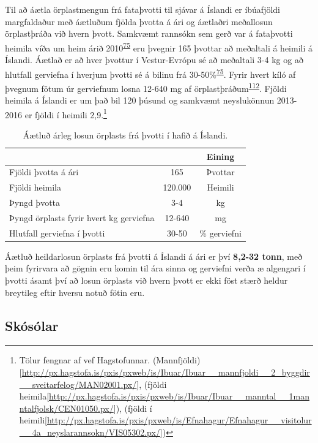 \documentclass[icelandic,]{book}
\let\rmarkdownfootnote\footnote%
\def\footnote{\protect\rmarkdownfootnote}
\begin{document}
Til að áætla örplastmengun frá fataþvotti til sjávar á Íslandi er íbúafjöldi margfaldaður með áætluðum fjölda þvotta á ári og áætlaðri meðallosun örplastþráða við hvern þvott. Samkvæmt rannsókn sem gerð var á fataþvotti heimila víða um heim árið 2010\textsuperscript{\protect\hyperlink{ref-Pakula2010}{75}} eru þvegnir 165 þvottar að meðaltali á heimili á Íslandi. Áætlað er að hver þvottur í Vestur-Evrópu sé að meðaltali 3-4 kg og að hlutfall gerviefna í hverjum þvotti sé á bilinu frá 30-50\%\textsuperscript{\protect\hyperlink{ref-Pakula2010}{75}}. Fyrir hvert kíló af þvegnum fötum úr gerviefnum losna 12-640 mg af örplastþráðum\textsuperscript{\protect\hyperlink{ref-magnusson2016swedish}{112}}. Fjöldi heimila á Íslandi er um það bil 120 þúsund og samkvæmt neyslukönnun 2013-2016 er fjöldi í heimili 2,9.\footnote{Tölur fengnar af vef Hagstofunnar. (Mannfjöldi){[}\url{http://px.hagstofa.is/pxis/pxweb/is/Ibuar/Ibuar__mannfjoldi__2_byggdir__sveitarfelog/MAN02001.px/}{]}, (fjöldi heimila{[}\url{http://px.hagstofa.is/pxis/pxweb/is/Ibuar/Ibuar__manntal__1manntalfjolsk/CEN01050.px/}{]}), (fjöldi í heimili{[}\url{http://px.hagstofa.is/pxis/pxweb/is/Efnahagur/Efnahagur__visitolur__4a_neyslarannsokn/VIS05302.px/}{]})}

\begin{table}[t]

\caption{\label{tab:unnamed-chunk-12}Áætluð árleg losun örplasts frá þvotti í hafið á Íslandi.}
\centering
\begin{tabular}{lcc}
\toprule
  &  & Eining\\
\midrule
Fjöldi þvotta á ári & 165 & Þvottar\\
Fjöldi heimila & 120.000 & Heimili\\
Þyngd þvotta & 3-4 & kg\\
Þyngd örplasts fyrir hvert kg gerviefna & 12-640 & mg\\
Hlutfall gerviefna í þvotti & 30-50 & \% gerviefni\\
\bottomrule
\end{tabular}
\end{table}

Áætluð heildarlosun örplasts frá þvotti á Íslandi á ári er því \textbf{8,2-32 tonn}, með þeim fyrirvara að gögnin eru komin til ára sinna og gerviefni verða æ algengari í þvotti ásamt því að losun örplasts við hvern þvott er ekki föst stærð heldur breytileg eftir hversu notuð fötin eru.

\hypertarget{skosolar}{%
\subsection*{Skósólar}\label{skosolar}}
\end{document}
